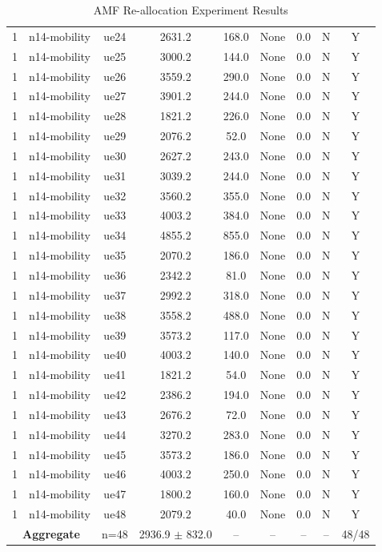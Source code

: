 \begin{table}[ht]
\begin{tabular}{|c|c|c|c|c|c|c|c|c|}
1 & n14-mobility & ue24 & 2631.2 & 168.0 & None & 0.0 & N & Y \\
1 & n14-mobility & ue25 & 3000.2 & 144.0 & None & 0.0 & N & Y \\
1 & n14-mobility & ue26 & 3559.2 & 290.0 & None & 0.0 & N & Y \\
1 & n14-mobility & ue27 & 3901.2 & 244.0 & None & 0.0 & N & Y \\
1 & n14-mobility & ue28 & 1821.2 & 226.0 & None & 0.0 & N & Y \\
1 & n14-mobility & ue29 & 2076.2 & 52.0 & None & 0.0 & N & Y \\
1 & n14-mobility & ue30 & 2627.2 & 243.0 & None & 0.0 & N & Y \\
1 & n14-mobility & ue31 & 3039.2 & 244.0 & None & 0.0 & N & Y \\
1 & n14-mobility & ue32 & 3560.2 & 355.0 & None & 0.0 & N & Y \\
1 & n14-mobility & ue33 & 4003.2 & 384.0 & None & 0.0 & N & Y \\
1 & n14-mobility & ue34 & 4855.2 & 855.0 & None & 0.0 & N & Y \\
1 & n14-mobility & ue35 & 2070.2 & 186.0 & None & 0.0 & N & Y \\
1 & n14-mobility & ue36 & 2342.2 & 81.0 & None & 0.0 & N & Y \\
1 & n14-mobility & ue37 & 2992.2 & 318.0 & None & 0.0 & N & Y \\
1 & n14-mobility & ue38 & 3558.2 & 488.0 & None & 0.0 & N & Y \\
1 & n14-mobility & ue39 & 3573.2 & 117.0 & None & 0.0 & N & Y \\
1 & n14-mobility & ue40 & 4003.2 & 140.0 & None & 0.0 & N & Y \\
1 & n14-mobility & ue41 & 1821.2 & 54.0 & None & 0.0 & N & Y \\
1 & n14-mobility & ue42 & 2386.2 & 194.0 & None & 0.0 & N & Y \\
1 & n14-mobility & ue43 & 2676.2 & 72.0 & None & 0.0 & N & Y \\
1 & n14-mobility & ue44 & 3270.2 & 283.0 & None & 0.0 & N & Y \\
1 & n14-mobility & ue45 & 3573.2 & 186.0 & None & 0.0 & N & Y \\
1 & n14-mobility & ue46 & 4003.2 & 250.0 & None & 0.0 & N & Y \\
1 & n14-mobility & ue47 & 1800.2 & 160.0 & None & 0.0 & N & Y \\
1 & n14-mobility & ue48 & 2079.2 & 40.0 & None & 0.0 & N & Y \\
\multicolumn{2}{|c|}{\textbf{Aggregate}} & n=48 & 2936.9 $\pm$ 832.0 & -- & -- & -- & -- & 48/48 \\
\hline
\end{tabular}
\caption{AMF Re-allocation Experiment Results}
\label{tab:amf_realloc}
\end{table}

